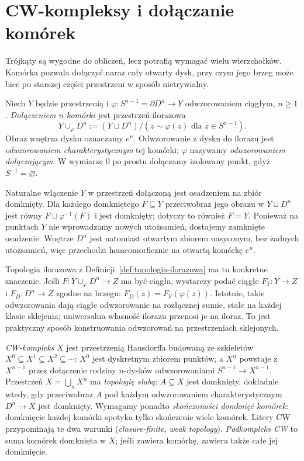 \section{CW-kompleksy i dołączanie komórek}
\label{sec:cw-kompleksy}

Trójkąty są wygodne do obliczeń, lecz
potrafią wymagać wielu wierzchołków.
Komórka pozwala dołączyć naraz cały
otwarty dysk, przy czym jego brzeg
może biec po starszej części przestrzeni
w sposób nietrywialny.

\begin{definicja}
\label{def:dolaczenie-komorki}
Niech $Y$ będzie przestrzenią i
$\varphi:S^{n-1}=\partial D^n\to Y$
odwzorowaniem ciągłym, $n\geq1$.
\emph{Dołączeniem $n$-komórki} jest
przestrzeń ilorazowa
\[
 Y\cup_\varphi D^n
 :=(Y\sqcup D^n)/(z\sim\varphi(z)
 \text{ dla }z\in S^{n-1}).
\]
Obraz wnętrza dysku oznaczamy $e^n$.
Odwzorowanie z dysku do ilorazu jest
\emph{odwzorowaniem charakterystycznym}
tej komórki; $\varphi$ nazywamy
\emph{odwzorowaniem dołączającym}.
W wymiarze $0$ po prostu dołączamy
izolowany punkt, gdyż
$S^{-1}=\varnothing$.
\end{definicja}

Naturalne włączenie $Y$ w przestrzeń dołączoną jest osadzeniem
na zbiór domknięty. Dla każdego domkniętego $F\subseteq Y$
przeciwobraz jego obrazu w $Y\sqcup D^n$ jest równy
$F\sqcup\varphi^{-1}(F)$ i jest domknięty; dotyczy to również $F=Y$.
Ponieważ na punktach $Y$ nie wprowadzamy nowych utożsamień,
dostajemy zamknięte osadzenie. Wnętrze $D^n$ jest natomiast
otwartym zbiorem nasyconym, bez żadnych utożsamień, więc przechodzi
homeomorficznie na otwartą komórkę $e^n$.

Topologia ilorazowa z
Definicji~\ref{def:topologia-ilorazowa}
ma tu konkretne znaczenie. Jeśli
$F:Y\cup_\varphi D^n\to Z$
ma być ciągła, wystarczy podać
ciągłe $F_Y:Y\to Z$ i
$F_D:D^n\to Z$ zgodne na brzegu:
$F_D(z)=F_Y(\varphi(z))$.
Istotnie, takie odwzorowania dają ciągłe
odwzorowanie na rozłącznej sumie, stałe
na każdej klasie sklejenia;
uniwersalna własność ilorazu
przenosi je na iloraz.
To jest praktyczny sposób
konstruowania odwzorowań na przestrzeniach
sklejonych.

\begin{definicja}[CW-kompleks]
\label{def:cw-kompleks}
\emph{CW-kompleks} $X$ jest przestrzenią Hausdorffa budowaną
ze szkieletów $X^0\subseteq X^1
\subseteq X^2\subseteq\cdots$:
$X^0$ jest dyskretnym zbiorem punktów,
a $X^n$ powstaje z $X^{n-1}$
przez dołączenie rodziny $n$-dysków
odwzorowaniami $S^{n-1}\to X^{n-1}$.
Przestrzeń $X=\bigcup_n X^n$
ma \emph{topologię słabą}:
$A\subseteq X$ jest domknięty,
dokładnie wtedy, gdy przeciwobraz $A$ pod każdym
odwzorowaniem charakterystycznym $D^n\to X$
jest domknięty. Wymagamy ponadto
\emph{skończoności domknięć komórek}:
domknięcie każdej komórki
spotyka tylko skończenie wiele
komórek. Litery CW przypominają
te dwa warunki
(\emph{closure-finite}, \emph{weak topology}).
\emph{Podkompleks CW} to suma komórek
domknięta w $X$; jeśli zawiera komórkę,
zawiera także całe jej domknięcie.
\end{definicja}

